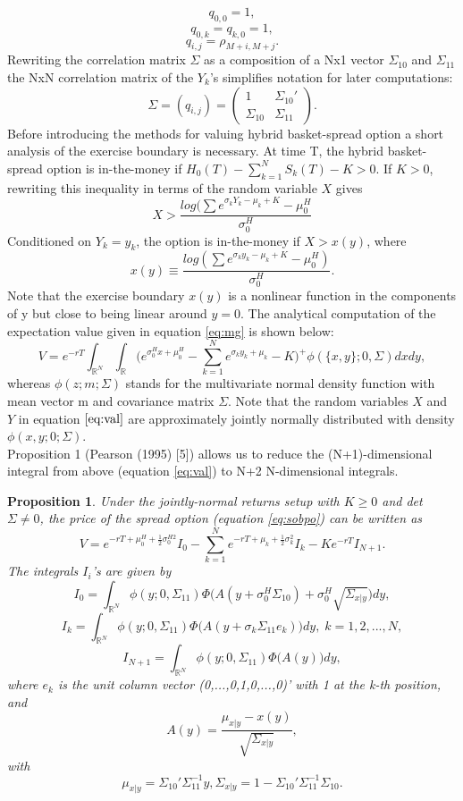 \documentclass[a4paper]{article}
\begin{document}
$$q_{0,0}=1,$$ 
$$q_{0,k}=q_{k,0}=1,$$
$$q_{i,j}=\rho_{M+i,M+j}.$$
Rewriting the correlation matrix $\Sigma$ as a composition of a Nx1 vector $\Sigma_{10}$ and $\Sigma_{11}$ the NxN correlation matrix of the $Y_k$'s simplifies notation for later computations:
$$\Sigma = (q_{i,j}) = \begin{pmatrix} 1 & \Sigma_{10}' \\ \Sigma_{10} & \Sigma_{11} \end{pmatrix}.$$ 
Before introducing the methods for valuing hybrid basket-spread option a short analysis of the exercise boundary is necessary. At time T, the hybrid basket-spread option is in-the-money 
if $H_0(T) - \sum_{k=1}^N S_k(T)-K>0$. If $K>0$, rewriting this inequality in terms of the random variable $X$ gives
$$X>\frac{log(\sum e^{\sigma_kY_k-\mu_k+K}-\mu_0^H}{\sigma_0^H}$$
Conditioned on $Y_k=y_k$, the option is in-the-money if $X>x(y)$, where
$$x(y)\equiv\frac{log(\sum e^{\sigma_ky_k-\mu_k+K}-\mu_0^H)}{\sigma_0^H}.$$
Note that the exercise boundary $x(y)$ is a nonlinear function in the components of y but close to being linear around $y=0$.
The analytical computation of the expectation value given in equation \ref{eq:mg} is shown below:
\begin{equation}
\label{eq:val}
V= e^{-rT} \int_{\mathbb{R}^N} \int_\mathbb{R} \big(e^{\sigma_0^Hx+\mu_0^H}-\sum_{k=1}^Ne^{\sigma_ky_k+\mu_k}-K\big)^+\phi(\{x,y\};0,\Sigma) dx dy,
\end{equation}
whereas $\phi(z;m;\Sigma)$ stands for the multivariate normal density function with mean vector m and covariance matrix $\Sigma$. Note that the random variables $X$ and $Y$ in equation $\ref{eq:val}$ are approximately jointly normally distributed with density $\phi({x,y};0;\Sigma)$.\\
Proposition 1 (Pearson (1995) [5]) allows us to reduce the (N+1)-dimensional integral from above (equation \ref{eq:val}) to N+2 N-dimensional integrals.

\newtheorem{prop}{Proposition}
\begin{prop}
\label{prop:price}
Under the jointly-normal returns setup with $K \geq 0$ and det $\Sigma \neq 0$, the price of the spread option (equation \ref{eq:sobpo}) can be written as
$$V=e^{-rT+\mu_0^H+\frac{1}{2}\sigma_0^{H2}}I_0-\sum_{k=1}^Ne^{-rT+\mu_k+\frac{1}{2}\sigma_k^2}I_k-Ke^{-rT}I_{N+1}.$$
The integrals $I_i$'s are given by
$$I_0=\int_{\mathbb{R}^N}\phi(y;0,\Sigma_{11})\Phi\big(A(y+\sigma_0^H\Sigma_{10})+\sigma_0^H\sqrt{\Sigma_{x|y}}\big)dy,$$
$$I_k=\int_{\mathbb{R}^N}\phi(y;0,\Sigma_{11})\Phi\big(A(y+\sigma_k\Sigma_{11}e_k)\big)dy, \; k=1,2,...,N,$$
$$I_{N+1}=\int_{\mathbb{R}^N}\phi(y;0,\Sigma_{11})\Phi\big(A(y)\big)dy,$$
where $e_k$ is the unit column vector (0,...,0,1,0,...,0)' with 1 at the k-th position, and
$$A(y)=\frac{\mu_{x|y}-x(y)}{\sqrt{\Sigma_{x|y}}},$$
with
$$\mu_{x|y}=\Sigma_{10}'\Sigma_{11}^{-1}y, \Sigma_{x|y}=1-\Sigma_{10}'\Sigma_{11}^{-1}\Sigma_{10}.$$
\end{prop}
\end{document}
